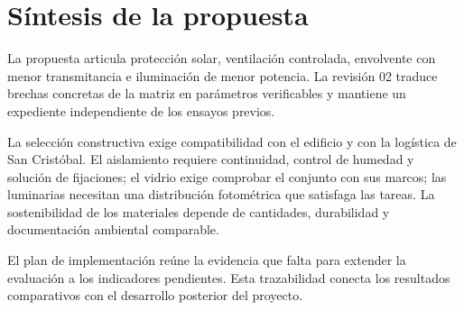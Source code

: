 \section{Síntesis de la propuesta}
\begin{textoDosTercios}
La propuesta articula protección solar, ventilación controlada, envolvente con menor transmitancia e iluminación de menor potencia. La revisión 02 traduce brechas concretas de la matriz en parámetros verificables y mantiene un expediente independiente de los ensayos previos.

La selección constructiva exige compatibilidad con el edificio y con la logística de San Cristóbal. El aislamiento requiere continuidad, control de humedad y solución de fijaciones; el vidrio exige comprobar el conjunto con sus marcos; las luminarias necesitan una distribución fotométrica que satisfaga las tareas. La sostenibilidad de los materiales depende de cantidades, durabilidad y documentación ambiental comparable.

El plan de implementación reúne la evidencia que falta para extender la evaluación a los indicadores pendientes. Esta trazabilidad conecta los resultados comparativos con el desarrollo posterior del proyecto.
\end{textoDosTercios}
